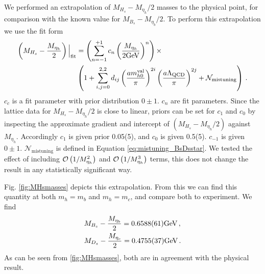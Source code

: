 We performed an extrapolation of $M_{H_s}-M_{\eta_h}/2$ masses to the physical point, for comparison with the known value for $M_{B_s}-M_{\eta_b}/2$. To perform this extrapolation we use the fit form
\begin{align}
  \left(M_{H_s}-{M_{\eta_h}\over2}\right)\Big|_{\text{fit}}& =
  \left( \sum_{n=-1}^{+1} c_n \left({M_{\eta_h}\over 2\text{GeV}}\right)^n\right) \times
  \\ &\left( 1 + \sum_{i,j=0}^{2,2} d_{ij} \left({ am_{h0}^{\text{val}} \over \pi }\right)^{2i} \left({ a\Lambda_{\text{QCD}} \over \pi }\right)^{2j} + \mathcal{N}_{\text{mistuning}} \right)\,.
    \nonumber
\end{align}
$c_c$ is a fit parameter with prior distribution $0\pm 1$. $c_n$ are fit parameters. Since the lattice data for $M_{H_s}-M_{\eta_h}/2$ is close to linear, priors can be set for $c_{1}$ and $c_0$ by inspecting the approximate gradient and intercept of $\left(M_{H_s}-{M_{\eta_h}/2}\right)$ against $M_{\eta_h}$. Accordingly $c_{1}$ is given prior 0.05(5), and $c_0$ is given 0.5(5). $c_{-1}$ is given $0\pm 1$. $\mathcal{N}_{\text{mistuning}}$ is defined in Equation \eqref{eq:mistuning_BsDsstar}. We tested the effect of including $\mathcal{O}\left( 1/M_{\eta_h}^2 \right)$ and $\mathcal{O}\left( 1/M_{\eta_h}^3 \right)$ terms, this does not change the result in any statistically significant way.

Fig. \ref{fig:MHsmasses} depicts this extrapolation. From this we can find this quantity at both $m_h=m_b$ and $m_h=m_c$, and compare both to experiment. We find
\begin{align}
  &M_{B_s} - {M_{\eta_b}\over 2} =  0.6588(61) \text{GeV}\,, \\
  &M_{D_s} - {M_{\eta_c}\over 2} =  0.4755(37)  \text{GeV}\,.
\end{align}
As can be seen from \ref{fig:MHsmasses}, both are in agreement with the physical result.

